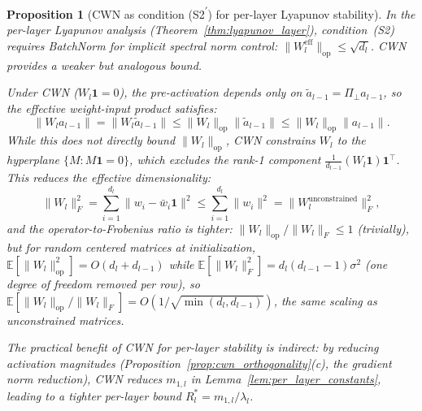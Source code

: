 \documentclass{article}
\providecommand{\E}{\mathbb{E}}
\providecommand{\norm}[1]{\lVert #1 \rVert}
\theoremstyle{plain}
\newtheorem{proposition}{Proposition}
\theoremstyle{definition}
\theoremstyle{remark}
\begin{document}
\begin{proposition}[CWN as condition (S2\textsuperscript{$\prime$}) for per-layer Lyapunov stability]
\label{prop:cwn_s2_prime}
In the per-layer Lyapunov analysis (Theorem~\ref{thm:lyapunov_layer}), condition~(S2) requires BatchNorm for implicit spectral norm control: $\norm{W_l^{\mathrm{eff}}}_{\mathrm{op}} \leq \sqrt{d_l}$. CWN provides a weaker but analogous bound.

Under CWN ($W_l\mathbf{1} = 0$), the pre-activation depends only on $\tilde{a}_{l-1} = \Pi_\perp a_{l-1}$, so the effective weight-input product satisfies:
\begin{equation}
    \norm{W_l a_{l-1}} = \norm{W_l \tilde{a}_{l-1}} \leq \norm{W_l}_{\mathrm{op}}\norm{\tilde{a}_{l-1}} \leq \norm{W_l}_{\mathrm{op}}\norm{a_{l-1}}.
\end{equation}
While this does not directly bound $\norm{W_l}_{\mathrm{op}}$, CWN constrains $W_l$ to the hyperplane $\{M : M\mathbf{1} = 0\}$, which excludes the rank-1 component $\frac{1}{d_{l-1}}(W_l\mathbf{1})\mathbf{1}^\top$. This reduces the effective dimensionality:
\begin{equation}
    \norm{W_l}_F^2 = \sum_{i=1}^{d_l}\norm{w_i - \bar{w}_i\mathbf{1}}^2 \leq \sum_{i=1}^{d_l}\norm{w_i}^2 = \norm{W_l^{\mathrm{unconstrained}}}_F^2,
\end{equation}
and the operator-to-Frobenius ratio is tighter: $\norm{W_l}_{\mathrm{op}}/\norm{W_l}_F \leq 1$ (trivially), but for random centered matrices at initialization, $\E[\norm{W_l}_{\mathrm{op}}^2] = O(d_l + d_{l-1})$ while $\E[\norm{W_l}_F^2] = d_l(d_{l-1}-1)\sigma^2$ (one degree of freedom removed per row), so $\E[\norm{W_l}_{\mathrm{op}}/\norm{W_l}_F] = O(1/\sqrt{\min(d_l, d_{l-1})})$, the same scaling as unconstrained matrices.

The practical benefit of CWN for per-layer stability is \emph{indirect}: by reducing activation magnitudes (Proposition~\ref{prop:cwn_orthogonality}(c), the gradient norm reduction), CWN reduces $m_{1,l}$ in Lemma~\ref{lem:per_layer_constants}, leading to a tighter per-layer bound $R_l^* = m_{1,l}/\lambda_l$.
\end{proposition}
\end{document}
